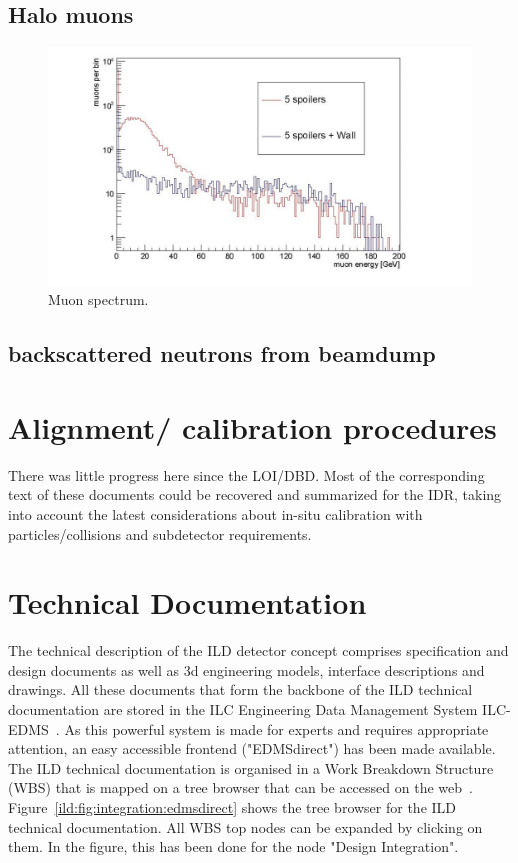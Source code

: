 \subsection{Halo muons}

\begin{figure}[t!]
\includegraphics[width=0.8\hsize]{Integration/fig/BG_muons.jpg}
\caption{\label{fig:integration:rates}Muon spectrum.}
\end{figure}


\subsection{backscattered neutrons from beamdump}


\vspace{2cm}

\section{Alignment/ calibration procedures}

There was little progress here since the LOI/DBD. Most of the corresponding text of these documents could be recovered and summarized for the IDR, taking into account the latest considerations about in-situ calibration with particles/collisions and subdetector requirements.

\vspace{2cm}

\section{Technical Documentation}

The technical description of the ILD detector concept comprises specification and design documents as well as 3d engineering models, interface descriptions and drawings. All these documents that form the backbone of the ILD technical documentation are stored in the ILC Engineering Data Management System ILC-EDMS~\cite{ild:bib:edms}. As this powerful system is made for experts and requires appropriate attention, an easy accessible frontend ("EDMSdirect") has been made available. The ILD technical documentation is organised in a Work Breakdown Structure (WBS) that is mapped on a tree browser that can be accessed on the web~\cite{ild:bib:edmsdirect}. Figure~\ref{ild:fig:integration:edmsdirect} shows the tree browser for the ILD technical documentation. All WBS top nodes can be expanded by clicking on them. In the figure, this has been done for the node "Design Integration".


